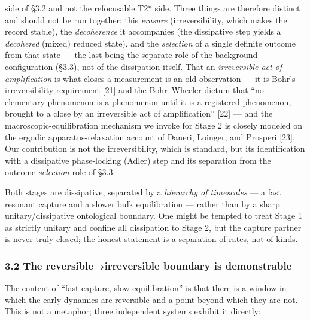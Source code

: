 \documentclass[
]{article}
\begin{document}
\begin{itemize}
  side of §3.2 and not the refocusable T2* side. Three things are
  therefore distinct and should not be run together: this \emph{erasure}
  (irreversibility, which makes the record stable), the
  \emph{decoherence} it accompanies (the dissipative step yields a
  \emph{decohered} (mixed) reduced state), and the \emph{selection} of a
  single definite outcome from that state --- the last being the
  separate role of the background configuration (§3.3), not of the
  dissipation itself. That an \emph{irreversible act of amplification}
  is what closes a measurement is an old observation --- it is Bohr's
  irreversibility requirement {[}21{]} and the Bohr--Wheeler dictum that
  ``no elementary phenomenon is a phenomenon until it is a registered
  phenomenon, brought to a close by an irreversible act of
  amplification'' {[}22{]} --- and the macroscopic-equilibration
  mechanism we invoke for Stage 2 is closely modeled on the ergodic
  apparatus-relaxation account of Daneri, Loinger, and Prosperi
  {[}23{]}. Our contribution is not the irreversibility, which is
  standard, but its identification with a dissipative phase-locking
  (Adler) step and its separation from the outcome-\emph{selection} role
  of §3.3.
\end{itemize}

Both stages are dissipative, separated by a \emph{hierarchy of
timescales} --- a fast resonant capture and a slower bulk equilibration
--- rather than by a sharp unitary/dissipative ontological boundary. One
might be tempted to treat Stage 1 as strictly unitary and confine all
dissipation to Stage 2, but the capture partner is never truly closed;
the honest statement is a separation of rates, not of kinds.

\subsubsection{3.2 The reversible→irreversible boundary is
demonstrable}\label{the-reversibleirreversible-boundary-is-demonstrable}

The content of ``fast capture, slow equilibration'' is that there is a
window in which the early dynamics are reversible and a point beyond
which they are not. This is not a metaphor; three independent systems
exhibit it directly:
\end{document}

